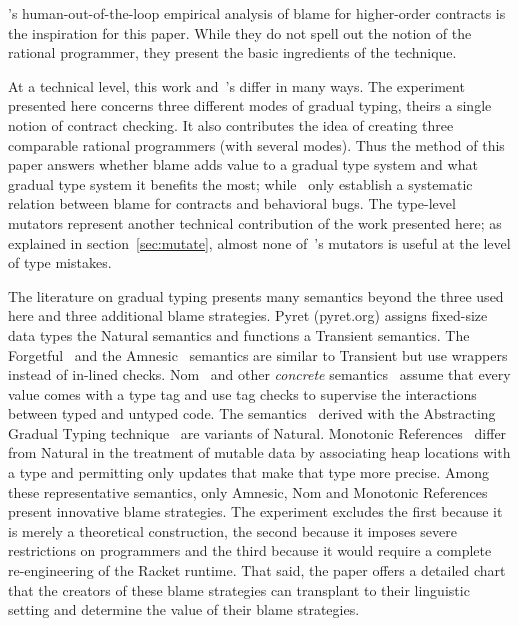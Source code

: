 
\citet{lksfd-popl-2020}'s human-out-of-the-loop empirical analysis of blame for
higher-order contracts is the inspiration for this paper.  While they do not
spell out the notion of the rational programmer, they present the basic
ingredients of the technique.

At a technical level, this work and~\citet{lksfd-popl-2020}'s differ in
many ways. The experiment presented here concerns three different modes of
gradual typing, theirs a single notion of contract checking.  It also
contributes the idea of creating three comparable rational programmers
(with several modes). Thus the method of this paper answers whether blame
adds value to a gradual type system and what gradual type system it
benefits the most; while~\citet{lksfd-popl-2020} only establish a
systematic relation between blame for contracts and behavioral bugs. The
type-level mutators represent another technical contribution of the work
presented here; as explained in section~\ref{sec:mutate}, almost none
of~\citet{lksfd-popl-2020}'s mutators is useful at the level of type
mistakes.

The literature on gradual typing presents many semantics beyond the three used
here and three additional blame strategies.  Pyret (pyret.org) assigns fixed-size
data types the Natural semantics and functions a Transient semantics. The
Forgetful~\citep{cl-icfp-2017} and the Amnesic~\citep{gfd-oopsla-2019} semantics
are similar to Transient but use wrappers instead of in-lined checks.
Nom~\citep{mt-oopsla-2017} and other \emph{concrete\/}
semantics~\citep{wnlov-popl-2010, rsfbv-popl-2015, rzv-ecoop-2015,
rat-oopsla-2017} assume that every value comes with a type tag and use tag
checks to supervise the interactions between typed and untyped code.  The semantics~\citep{tlt-popl-2019,
etg-icfp-19, tt-scp-20, tgt-popl-18, tt-sas-17} derived with the Abstracting
Gradual Typing technique~\citep{gct-popl-2016} are variants of Natural.
 Monotonic References~\citep{svctg-esop-2015, rsfbv-popl-2015, sfrbcsb-popl-2014, kas-pldi-2019} 
differ from Natural in the treatment of mutable data by
associating heap locations with a type and permitting only updates that 
make that type more precise.  
Among these representative semantics, only Amnesic, Nom and Monotonic References present innovative blame
strategies.  The experiment excludes the first because it is
merely a theoretical construction, the second because it imposes severe restrictions on
programmers and the third because it would require a complete
re-engineering of the Racket runtime. That said, the paper offers a
detailed chart that the creators of these blame strategies can transplant to their
linguistic setting and determine the value of their blame strategies.   
